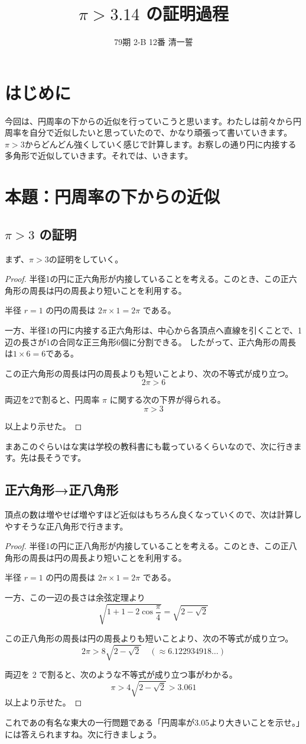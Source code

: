 \documentclass[dvipdfmx]{jlreq}
\title{$\pi > 3.14$ の証明過程}
\author{79期 2-B 12番 \CID{13748}清一誓}
\date{}
\begin{document}
\maketitle
\section{はじめに}
今回は、円周率の下からの近似を行っていこうと思います。わたしは前々から円周率を自分で近似したいと思っていたので、かなり頑張って書いていきます。
$\pi > 3$からどんどん強くしていく感じで計算します。お察しの通り円に内接する多角形で近似していきます。それでは、いきます。
\section{本題：円周率の下からの近似}
\subsection{$\pi > 3$ の証明}
まず、$\pi > 3$の証明をしていく。
\begin{proof}
半径1の円に正六角形が内接していることを考える。このとき、この正六角形の周長は円の周長より短いことを利用する。

半径 $r = 1$ の円の周長は $2\pi \times 1 = 2\pi$ である。

一方、半径1の円に内接する正六角形は、中心から各頂点へ直線を引くことで、1辺の長さが1の合同な正三角形6個に分割できる。
したがって、正六角形の周長は$1 \times 6=6$である。

この正六角形の周長は円の周長よりも短いことより、次の不等式が成り立つ。
\[ 2\pi>6 \]

両辺を2で割ると、円周率 $\pi$ に関する次の下界が得られる。
\[ \pi>3 \]

以上より示せた。
\end{proof}
まあこのぐらいはな実は学校の教科書にも載っているくらいなので、次に行きます。先は長そうです。
\subsection{正六角形→正八角形}
頂点の数は増やせば増やすほど近似はもちろん良くなっていくので、次は計算しやすそうな正八角形で行きます。
\begin{proof}
半径1の円に正八角形が内接していることを考える。このとき、この正八角形の周長は円の周長より短いことを利用する。

半径 $r = 1$ の円の周長は $2\pi \times 1 = 2\pi$ である。

一方、この一辺の長さは余弦定理より
\[ \sqrt{1+1-2\cos \frac{\pi}{4}}=\sqrt{2-\sqrt{2}} \]

この正八角形の周長は円の周長よりも短いことより、次の不等式が成り立つ。
\[ 2\pi>8\sqrt{2-\sqrt{2}} \quad (\approx 6.122934918\dots) \]

両辺を 2 で割ると、次のような不等式が成り立つ事がわかる。
\[ \pi>4\sqrt{2-\sqrt{2}}>3.061 \]
以上より示せた。
\end{proof}
これであの有名な東大の一行問題である「円周率が3.05より大きいことを示せ。」には答えられますね。次に行きましょう。
\end{document}
